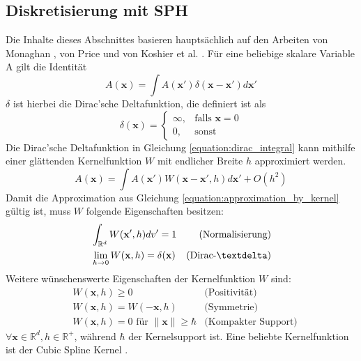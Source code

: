 \documentclass{scrreprt}
\begin{document}
\subsection{Diskretisierung mit SPH}
Die Inhalte dieses Abschnittes basieren hauptsächlich auf den Arbeiten
von Monaghan \cite{monaghan_smoothed_2005}, von Price \cite{price_smoothed_2012} und von Koshier et al. \cite{koschier_smoothed_2020}.
Für eine beliebige skalare Variable A gilt die Identität
\begin{equation}
    \label{equation:dirac_integral}
    A(\textbf{x}) = \int A(\textbf{x}') \delta(\textbf{x} - \textbf{x}') d\textbf{x}'
\end{equation}
$\delta$ ist hierbei die Dirac'sche Deltafunktion, die definiert ist als
\begin{equation}
    \delta(\textbf{x}) = \begin{cases}
        \infty, &\text{falls } \textbf{x} = 0\\
        0, &\text{sonst}
    \end{cases}
\end{equation}
Die Dirac'sche Deltafunktion in Gleichung \ref{equation:dirac_integral} kann mithilfe einer glättenden Kernelfunktion $W$ mit endlicher Breite $h$ approximiert werden.
\begin{equation}
    \label{equation:approximation_by_kernel}
    A(\textbf{x}) = \int A(\textbf{x}') W(\textbf{x} - \textbf{x}', h) d\textbf{x}' + O(h^2)
\end{equation}
Damit die Approximation aus Gleichung \ref{equation:approximation_by_kernel} gültig ist, muss $W$ folgende Eigenschaften besitzen:
\begin{align}
    &\int_{\mathbb{R}^d} W(\textbf{x}', h)dv' = 1 & \text{(Normalisierung)}\\
    &\lim_{h \to 0} W(\textbf{x}, h) = \delta(\textbf{x}) & \text{(Dirac-\textdelta)}
\end{align}
Weitere wünschenswerte Eigenschaften der Kernelfunktion $W$ sind:
\begin{align}
    &W(\textbf{x}, h) \geq 0 & \text{(Positivität)}\\
    &W(\textbf{x}, h) = W(-\textbf{x}, h) & \text{(Symmetrie)}\\
    &W(\textbf{x}, h) = 0 \text{ für } \| \textbf{x} \| \geq \hbar & \text{(Kompakter Support)}
\end{align}
$\forall \textbf{x} \in \mathbb{R}^d, h \in \mathbb{R}^+$, während $\hbar$ der Kernelsupport ist.
Eine beliebte Kernelfunktion ist der Cubic Spline Kernel \cite{monaghan_smoothed_1992}.
\end{document}
